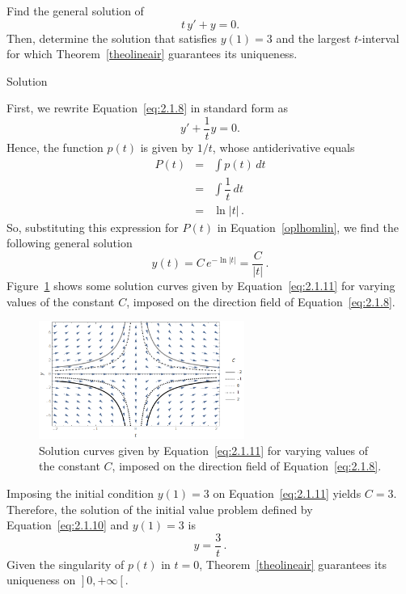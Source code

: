 \begin{example}
Find the general solution of
\begin{equation}
 t\,y'+y=0.\label{eq:2.1.8}
\end{equation}
Then, determine the solution that satisfies $y(1)=3$ and the largest $t$-interval for which Theorem~\ref{theolineair} guarantees its uniqueness. 


Solution 

First, we rewrite Equation~\eqref{eq:2.1.8} in standard form as
\begin{equation}\label{eq:2.1.10}
y'+\dfrac{1}{t}y=0.
\end{equation}
Hence, the function $p(t)$ is given by $1/t$, whose antiderivative equals
\begin{eqnarray*}
P(t)&=&\displaystyle\int p(t)\,d t\\
&=&\displaystyle\int\dfrac{1}{t} \, d t\\
&=&\ln|t|\,.
\end{eqnarray*}
So, substituting this expression for $P(t)$ in Equation~\eqref{oplhomlin}, we find the following general solution
\begin{equation}\label{eq:2.1.11}
y(t)=C\,e^{-\ln|t|}=\dfrac{C}{|t|}\,.
\end{equation}
Figure~\ref{ethomolin} shows some solution curves given by Equation~\eqref{eq:2.1.11} for varying values of the constant $C$, imposed on the direction field of Equation~\eqref{eq:2.1.8}. 
\begin{figure}[H]
	\begin{center}
			\includegraphics[width=0.6\textwidth]{exhomolin}
	\caption{Solution curves given by Equation~\eqref{eq:2.1.11} for varying values of the constant $C$, imposed on the direction field of Equation~\eqref{eq:2.1.8}.}
	\label{ethomolin}
	\end{center}
\end{figure}

Imposing the initial condition $y(1)=3$ on Equation~\eqref{eq:2.1.11} yields $C=3$. Therefore, the solution of the initial value problem defined by Equation~\eqref{eq:2.1.10} and $y(1)=3$ is
$$
y=\dfrac{3}{t}\,.
$$
Given the singularity of $p(t)$ in $t=0$, Theorem~\ref{theolineair} guarantees its uniqueness on  $\left.\right]0,+\infty\left[\right.$.

\end{example}

